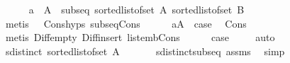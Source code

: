 \begin{isabellebody}
\isanewline
\ \ \ \ \isamarkupfalse%
\ {}{\isacharcolon}{\kern0pt}{\isachardoublequoteopen}a\ {\isasymin}\ A\ {\isasymLongrightarrow}\ subseq\ {\isacharparenleft}{\kern0pt}sorted{\isacharunderscore}{\kern0pt}list{\isacharunderscore}{\kern0pt}of{\isacharunderscore}{\kern0pt}set\ A{\isacharparenright}{\kern0pt}\ {\isacharparenleft}{\kern0pt}sorted{\isacharunderscore}{\kern0pt}list{\isacharunderscore}{\kern0pt}of{\isacharunderscore}{\kern0pt}set\ B{\isacharparenright}{\kern0pt}{\isachardoublequoteclose}\isanewline
\ \ \ \ \ \ \isamarkupfalse%
\ {\isacharparenleft}{\kern0pt}metis\ {\isachardoublequoteopen}{}{\isachardoublequoteclose}\ {\isachardoublequoteopen}{}{\isachardoublequoteclose}\ Cons{\isachardot}{\kern0pt}hyps{\isacharparenleft}{\kern0pt}{}{\isacharparenright}{\kern0pt}\ subseq{\isacharunderscore}{\kern0pt}Cons{}{\isacharparenright}{\kern0pt}\isanewline
\ \ \ \ \isamarkupfalse%
\ {\isachardoublequoteopen}a{\isasymnotin}A\ {\isasymLongrightarrow}\ {\isacharquery}{\kern0pt}case{\isachardoublequoteclose}\ \isamarkupfalse%
\ Cons\ {\isachardoublequoteopen}{}{\isachardoublequoteclose}\ {\isachardoublequoteopen}{}{\isachardoublequoteclose}\ {\isachardoublequoteopen}{}{\isachardoublequoteclose}\isanewline
\ \ \ \ \ \ \isamarkupfalse%
\ {\isacharparenleft}{\kern0pt}metis\ Diff{\isacharunderscore}{\kern0pt}empty\ Diff{\isacharunderscore}{\kern0pt}insert{}\ list{\isacharunderscore}{\kern0pt}emb{\isacharunderscore}{\kern0pt}Cons{\isacharparenright}{\kern0pt}\isanewline
\ \ \ \ \isamarkupfalse%
\ {\isacharquery}{\kern0pt}case\ \isamarkupfalse%
\ {\isachardoublequoteopen}{}{\isachardoublequoteclose}\ \isamarkupfalse%
\ auto\isanewline
\ \ \isamarkupfalse%
\isanewline
\ \ \isamarkupfalse%
\ {\isachardoublequoteopen}sdistinct\ {\isacharparenleft}{\kern0pt}{\isacharparenleft}{\kern0pt}sorted{\isacharunderscore}{\kern0pt}list{\isacharunderscore}{\kern0pt}of{\isacharunderscore}{\kern0pt}set\ A{\isacharparenright}{\kern0pt}{\isacharparenright}{\kern0pt}{\isachardoublequoteclose}\ \isanewline
\ \ \ \ \isamarkupfalse%
\ sdistinct{\isacharunderscore}{\kern0pt}subseq\ assms\ \isamarkupfalse%
\ simp\isanewline
{}\isamarkupfalse%
%
\endisatagproof
{\isafoldproof}%
%
\isadelimproof
\isanewline
%
\endisadelimproof

\end{isabellebody}
